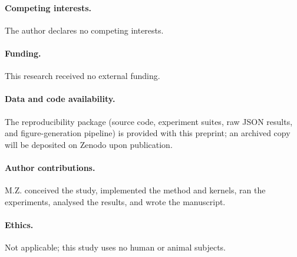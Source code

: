 \documentclass[11pt,a4paper]{article}
\begin{document}
\paragraph{Competing interests.} The author declares no competing interests.

\paragraph{Funding.} This research received no external funding.

\paragraph{Data and code availability.} The reproducibility package (source code, experiment suites, raw JSON results, and figure-generation pipeline) is provided with this preprint; an archived copy will be deposited on Zenodo upon publication.

\paragraph{Author contributions.} M.Z. conceived the study, implemented the method and kernels, ran the experiments, analysed the results, and wrote the manuscript.

\paragraph{Ethics.} Not applicable; this study uses no human or animal subjects.
\end{document}
